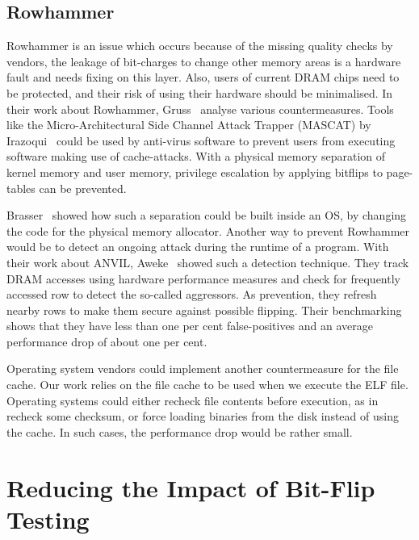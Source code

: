 \subsection{Rowhammer}

Rowhammer is an issue which occurs because of the missing quality checks by
vendors, the leakage of bit-charges to change other memory areas is a hardware
fault and needs fixing on this layer. Also, users of current DRAM chips need to
be protected, and their risk of using their hardware should be minimalised. In
their work about Rowhammer, Gruss~\etal\cite{flipinthewall} analyse various
countermeasures. Tools like the Micro-Architectural Side Channel Attack Trapper
(MASCAT) by Irazoqui~\etal\cite{mascat} could be used by anti-virus software to
prevent users from executing software making use of cache-attacks. With a
physical memory separation of kernel memory and user memory, privilege
escalation by applying bitflips to page-tables can be prevented.

Brasser~\etal\cite{canttouch} showed how such a separation could be built
inside an OS, by changing the code for the physical memory allocator. Another
way to prevent Rowhammer would be to detect an ongoing attack during the runtime
of a program. With their work about ANVIL, Aweke~\etal\cite{anvil} showed such
a detection technique. They track DRAM accesses using hardware performance
measures and check for frequently accessed row to detect the so-called
aggressors. As prevention, they refresh nearby rows to make them secure against
possible flipping. Their benchmarking shows that they have less than one per
cent false-positives and an average performance drop of about one per cent.

Operating system vendors could implement another countermeasure for the file
cache. Our work relies on the file cache to be used when we execute the ELF
file. Operating systems could either recheck file contents before execution, as
in recheck some checksum, or force loading binaries from the disk instead of
using the cache. In such cases, the performance drop would be rather small.

\section{Reducing the Impact of Bit-Flip Testing}


